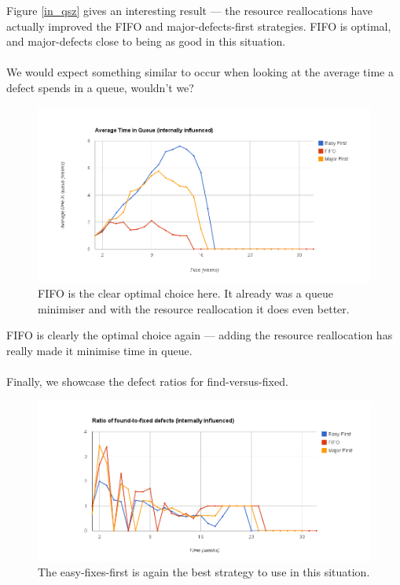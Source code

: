 Figure \ref{in_qsz} gives an interesting result --- the resource reallocations have actually
improved the FIFO and major-defects-first strategies.
FIFO is optimal, and major-defects close to being as good in this situation.\\
\\
We would expect something similar to occur when looking at the average time a defect spends in a
queue, wouldn't we?

\pagebreak

\begin{figure}[ht!]
	\centering
	\includegraphics[scale=0.45]{graphs/avgQueueTime_in.png}
	\caption{FIFO is the clear optimal choice here. It already was a queue minimiser and with the
resource reallocation it does even better.} 
	\label{in_avgqtime}
\end{figure}

FIFO is clearly the optimal choice again --- adding the resource reallocation has really made it
minimise time in queue.\\
\\
Finally, we showcase the defect ratios for find-versus-fixed.

\pagebreak

\begin{figure}[ht!]
	\centering
	\includegraphics[scale=0.45]{graphs/RatioFF_in.png}
	\caption{The easy-fixes-first is again the best strategy to use in this situation.}
	\label{in_ratioff}
\end{figure}

